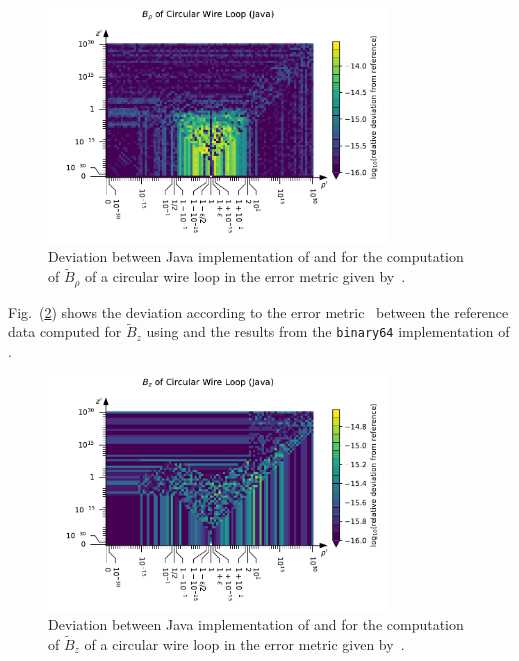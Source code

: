 \begin{figure}[htbp]
 \centering
 \includegraphics[width=0.8\textwidth]{img/CircularWireLoop_B_rho_Java.pdf}
 \caption{Deviation between Java implementation of  and 
          for the computation of $\tilde{B}_\rho$ of a circular wire loop
          in the error metric given by~.}
 \label{fig:CircularWireLoop_B_rho_Java}
\end{figure}
Fig.~(\ref{fig:CircularWireLoop_B_z_Java}) shows the deviation
according to the error metric~
between the reference data computed for $\tilde{B}_z$ using 
and the results from the \texttt{binary64} implementation of .
\begin{figure}[htbp]
 \centering
 \includegraphics[width=0.8\textwidth]{img/CircularWireLoop_B_z_Java.pdf}
 \caption{Deviation between Java implementation of  and 
          for the computation of $\tilde{B}_z$ of a circular wire loop
          in the error metric given by~.}
 \label{fig:CircularWireLoop_B_z_Java}
\end{figure}


